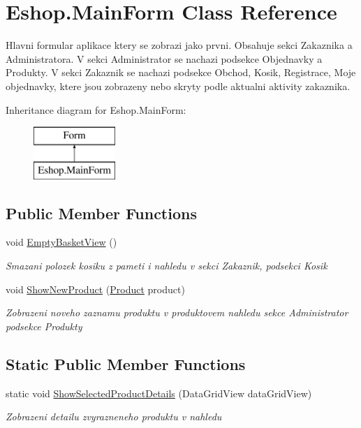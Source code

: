 \hypertarget{class_eshop_1_1_main_form}{}\section{Eshop.\+Main\+Form Class Reference}
\label{class_eshop_1_1_main_form}


Hlavni formular aplikace ktery se zobrazi jako prvni. Obsahuje sekci Zakaznika a Administratora. V sekci Administrator se nachazi podsekce Objednavky a Produkty. V sekci Zakaznik se nachazi podsekce Obchod, Kosik, Registrace, Moje objednavky, ktere jsou zobrazeny nebo skryty podle aktualni aktivity zakaznika.  


Inheritance diagram for Eshop.\+Main\+Form\+:\begin{figure}[H]
\begin{center}
\leavevmode
\includegraphics[height=2.000000cm]{class_eshop_1_1_main_form}
\end{center}
\end{figure}
\subsection*{Public Member Functions}
\begin{DoxyCompactItemize}
\item 
void \mbox{\hyperlink{class_eshop_1_1_main_form_a8a308e6f194e975bf24b8ba65e219b5d}{Empty\+Basket\+View}} ()
\begin{DoxyCompactList}\small\item\em Smazani polozek kosiku z pameti i nahledu v sekci Zakaznik, podsekci Kosik \end{DoxyCompactList}\item 
void \mbox{\hyperlink{class_eshop_1_1_main_form_a41fcf34c450b8a25e599dd1df8b7baf3}{Show\+New\+Product}} (\mbox{\hyperlink{class_eshop_1_1_product}{Product}} product)
\begin{DoxyCompactList}\small\item\em Zobrazeni noveho zaznamu produktu v produktovem nahledu sekce Administrator podsekce Produkty \end{DoxyCompactList}\end{DoxyCompactItemize}
\subsection*{Static Public Member Functions}
\begin{DoxyCompactItemize}
\item 
static void \mbox{\hyperlink{class_eshop_1_1_main_form_a213434c5cc934d6885cfaba85ab90fce}{Show\+Selected\+Product\+Details}} (Data\+Grid\+View data\+Grid\+View)
\begin{DoxyCompactList}\small\item\em Zobrazeni detailu zvyrazneneho produktu v nahledu \end{DoxyCompactList}\end{DoxyCompactItemize}
